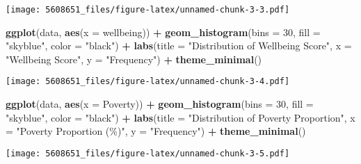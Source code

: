 \documentclass[
]{article}
\newenvironment{Shaded}{\begin{snugshade}}{\end{snugshade}}
\newcommand{\AttributeTok}[1]{\textcolor[rgb]{0.13,0.29,0.53}{#1}}
\newcommand{\DecValTok}[1]{\textcolor[rgb]{0.00,0.00,0.81}{#1}}
\newcommand{\FunctionTok}[1]{\textcolor[rgb]{0.13,0.29,0.53}{\textbf{#1}}}
\newcommand{\NormalTok}[1]{#1}
\newcommand{\SpecialCharTok}[1]{\textcolor[rgb]{0.81,0.36,0.00}{\textbf{#1}}}
\newcommand{\StringTok}[1]{\textcolor[rgb]{0.31,0.60,0.02}{#1}}
\begin{document}
\texttt{[image: 5608651\_files/figure-latex/unnamed-chunk-3-3.pdf]}

\begin{Shaded}
\begin{Highlighting}[]
\FunctionTok{ggplot}\NormalTok{(data, }\FunctionTok{aes}\NormalTok{(}\AttributeTok{x =}\NormalTok{ wellbeing)) }\SpecialCharTok{+}
  \FunctionTok{geom\_histogram}\NormalTok{(}\AttributeTok{bins =} \DecValTok{30}\NormalTok{, }\AttributeTok{fill =} \StringTok{"skyblue"}\NormalTok{, }\AttributeTok{color =} \StringTok{"black"}\NormalTok{) }\SpecialCharTok{+}
  \FunctionTok{labs}\NormalTok{(}\AttributeTok{title =} \StringTok{"Distribution of Wellbeing Score"}\NormalTok{, }\AttributeTok{x =} \StringTok{"Wellbeing Score"}\NormalTok{, }\AttributeTok{y =} \StringTok{"Frequency"}\NormalTok{) }\SpecialCharTok{+}
  \FunctionTok{theme\_minimal}\NormalTok{()}
\end{Highlighting}
\end{Shaded}

\texttt{[image: 5608651\_files/figure-latex/unnamed-chunk-3-4.pdf]}

\begin{Shaded}
\begin{Highlighting}[]
\FunctionTok{ggplot}\NormalTok{(data, }\FunctionTok{aes}\NormalTok{(}\AttributeTok{x =}\NormalTok{ Poverty)) }\SpecialCharTok{+}
  \FunctionTok{geom\_histogram}\NormalTok{(}\AttributeTok{bins =} \DecValTok{30}\NormalTok{, }\AttributeTok{fill =} \StringTok{"skyblue"}\NormalTok{, }\AttributeTok{color =} \StringTok{"black"}\NormalTok{) }\SpecialCharTok{+}
  \FunctionTok{labs}\NormalTok{(}\AttributeTok{title =} \StringTok{"Distribution of Poverty Proportion"}\NormalTok{, }\AttributeTok{x =} \StringTok{"Poverty Proportion (\%)"}\NormalTok{, }\AttributeTok{y =} \StringTok{"Frequency"}\NormalTok{) }\SpecialCharTok{+}
  \FunctionTok{theme\_minimal}\NormalTok{()}
\end{Highlighting}
\end{Shaded}

\texttt{[image: 5608651\_files/figure-latex/unnamed-chunk-3-5.pdf]}
\end{document}
